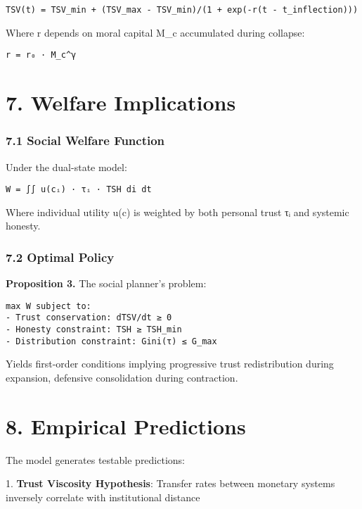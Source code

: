\documentclass[11pt,oneside]{book}
\begin{document}
\begin{verbatim}
TSV(t) = TSV_min + (TSV_max - TSV_min)/(1 + exp(-r(t - t_inflection)))
\end{verbatim}

Where r depends on moral capital M\_c accumulated during collapse:

\begin{verbatim}
r = r₀ · M_c^γ
\end{verbatim}

\section{7. Welfare Implications}

\subsubsection{7.1 Social Welfare Function}

Under the dual-state model:

\begin{verbatim}
W = ∫∫ u(cᵢ) · τᵢ · TSH di dt
\end{verbatim}

Where individual utility u(c) is weighted by both personal trust τᵢ and systemic honesty.

\subsubsection{7.2 Optimal Policy}

\textbf{Proposition 3.} The social planner's problem:

\begin{verbatim}
max W subject to:
- Trust conservation: dTSV/dt ≥ 0
- Honesty constraint: TSH ≥ TSH_min  
- Distribution constraint: Gini(τ) ≤ G_max
\end{verbatim}

Yields first-order conditions implying progressive trust redistribution during expansion, defensive consolidation during contraction.

\section{8. Empirical Predictions}

The model generates testable predictions:


1. \textbf{Trust Viscosity Hypothesis}: Transfer rates between monetary systems inversely correlate with institutional distance
\end{document}
